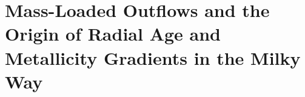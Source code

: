 \documentclass[main.tex]{subfiles}
\begin{document}
\chapter{Mass-Loaded Outflows and the Origin of Radial Age and Metallicity
Gradients in the Milky Way}
\label{outflows}



\end{document}
